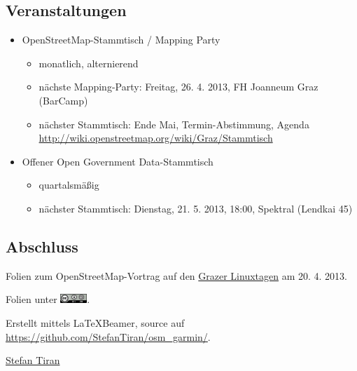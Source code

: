 \documentclass{beamer}
\begin{document}
\subsection{Veranstaltungen}
\begin{frame}
  \begin{itemize}
    \item OpenStreetMap-Stammtisch / Mapping Party
    \begin{itemize}
      \item monatlich, alternierend
      \item nächste Mapping-Party: Freitag, 26. 4. 2013, FH Joanneum
        Graz (BarCamp)
      \item nächster Stammtisch: Ende Mai, Termin-Abstimmung, Agenda \url{http://wiki.openstreetmap.org/wiki/Graz/Stammtisch}
    \end{itemize}
    \item Offener Open Government Data-Stammtisch
    \begin{itemize}
      \item quartalsmäßig
      \item nächster Stammtisch: Dienstag, 21. 5. 2013, 18:00, Spektral (Lendkai 45)
    \end{itemize}
  \end{itemize}
\end{frame}

\subsection{Abschluss}
\begin{frame}

Folien zum OpenStreetMap-Vortrag auf den
\href{http://http://linuxtage.at/}{Grazer Linuxtagen} am 20. 4. 2013.
\vspace{1cm}

Folien unter \includegraphics[width=1cm]{cc-by-sa.png}.
\vspace{1cm}

Erstellt mittels \LaTeX Beamer, source auf \url{https://github.com/StefanTiran/osm_garmin/}.
\vspace{1cm}

\href{mailto:stefan.tiran@student.TUGraz.at}{Stefan Tiran}
\end{frame}
\end{document}
